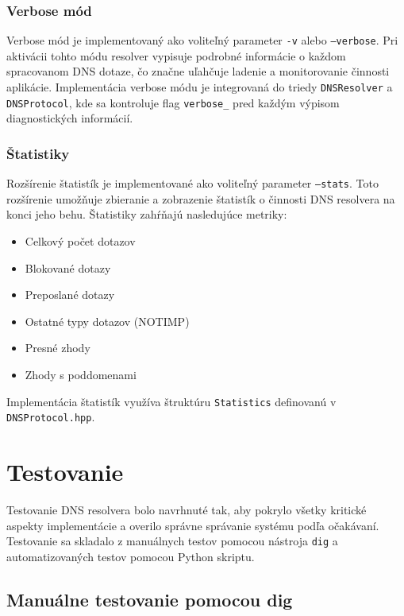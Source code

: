 \documentclass[12pt,a4paper]{article}
\begin{document}
\subsubsection{Verbose mód}

Verbose mód je implementovaný ako voliteľný parameter \texttt{-v} alebo \texttt{--verbose}. Pri aktivácii tohto módu resolver vypisuje podrobné informácie o každom spracovanom DNS dotaze, čo značne uľahčuje ladenie a monitorovanie činnosti aplikácie. Implementácia verbose módu je integrovaná do triedy \texttt{DNSResolver} a \texttt{DNSProtocol}, kde sa kontroluje flag \texttt{verbose\_} pred každým výpisom diagnostických informácií.

\subsubsection{Štatistiky}

Rozšírenie štatistík je implementované ako voliteľný parameter \texttt{--stats}. Toto rozšírenie umožňuje zbieranie a zobrazenie štatistík o činnosti DNS resolvera na konci jeho behu. Štatistiky zahŕňajú nasledujúce metriky:

\begin{itemize}
    \item Celkový počet dotazov
    \item Blokované dotazy
    \item Preposlané dotazy
    \item Ostatné typy dotazov (NOTIMP)
    \item Presné zhody
    \item Zhody s poddomenami
\end{itemize}

Implementácia štatistík využíva štruktúru \texttt{Statistics} definovanú v \texttt{DNSProtocol.hpp}.

\section{Testovanie}

Testovanie DNS resolvera bolo navrhnuté tak, aby pokrylo všetky kritické aspekty implementácie a overilo správne správanie systému podľa očakávaní. Testovanie sa skladalo z manuálnych testov pomocou nástroja \texttt{dig} a automatizovaných testov pomocou Python skriptu.

\subsection{Manuálne testovanie pomocou dig}
\end{document}
